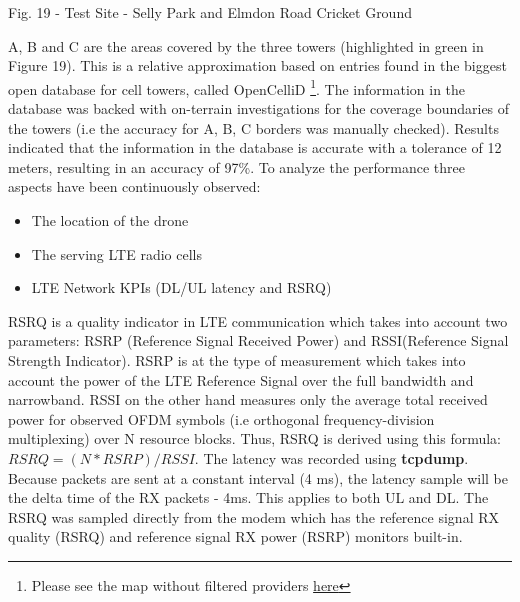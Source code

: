 \documentclass{IEEEtran}
\begin{document}
\begin{it}\begin{center}Fig. 19 - Test Site - Selly Park and Elmdon Road Cricket Ground \end{center}\end{it}
A, B and C are the areas covered by the three towers (highlighted in green in Figure 19). This is a relative approximation based on entries found in the biggest open database for cell towers, called OpenCelliD \footnote{Please see the map without filtered providers \hyperlink{https://opencellid.org/#zoom=16&lat=52.44013&lon=-1.92437}{here}}. The information in the database was backed with on-terrain investigations for the coverage boundaries of the towers (i.e the accuracy for A, B, C borders was manually checked). Results indicated that the information in the database is accurate with a tolerance of 12 meters, resulting in an accuracy of 97\%.
\newline
\newline
To analyze the performance three aspects have been continuously observed\citep{maskey_2015_latency}:
\begin{itemize}
    \item The location of the drone
    \item The serving LTE radio cells
    \item LTE Network KPIs (DL/UL latency and RSRQ)
\end{itemize}
RSRQ is a quality indicator in LTE communication which takes into account two parameters: RSRP (Reference Signal Received Power) and RSSI(Reference Signal Strength Indicator). RSRP is at the type of measurement which takes into account the power of the LTE Reference Signal over the full bandwidth and narrowband. RSSI on the other hand measures only the average total received power for observed OFDM symbols (i.e orthogonal frequency-division multiplexing) over N resource blocks. Thus, RSRQ is derived using this formula: $RSRQ = (N * RSRP) / RSSI$.
\newline
\newline
The latency was recorded using \textbf{tcpdump}. Because packets are sent at a constant interval (4 ms), the latency sample will be the delta time of the RX packets - 4ms. This applies to both UL and DL. The RSRQ was sampled directly from the modem which has the reference signal RX quality (RSRQ) and reference signal RX power (RSRP) monitors built-in.
\end{document}
